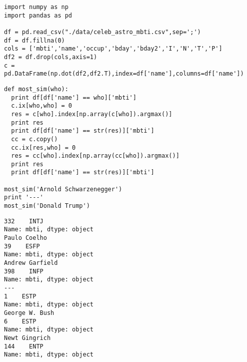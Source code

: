\documentclass[12pt,fleqn]{article}\usepackage{../common}
\begin{document}
\begin{verbatim}
import numpy as np
import pandas as pd

df = pd.read_csv("./data/celeb_astro_mbti.csv",sep=';')
df = df.fillna(0)
cols = ['mbti','name','occup','bday','bday2','I','N','T','P']
df2 = df.drop(cols,axis=1)
c = pd.DataFrame(np.dot(df2,df2.T),index=df['name'],columns=df['name'])
\end{verbatim}


\begin{verbatim}
def most_sim(who):
  print df[df['name'] == who]['mbti']
  c.ix[who,who] = 0
  res = c[who].index[np.array(c[who]).argmax()]
  print res
  print df[df['name'] == str(res)]['mbti']
  cc = c.copy()
  cc.ix[res,who] = 0
  res = cc[who].index[np.array(cc[who]).argmax()]
  print res
  print df[df['name'] == str(res)]['mbti']

most_sim('Arnold Schwarzenegger')
print '---'
most_sim('Donald Trump')
\end{verbatim}

\begin{verbatim}
332    INTJ
Name: mbti, dtype: object
Paulo Coelho
39    ESFP
Name: mbti, dtype: object
Andrew Garfield
398    INFP
Name: mbti, dtype: object
---
1    ESTP
Name: mbti, dtype: object
George W. Bush
6    ESTP
Name: mbti, dtype: object
Newt Gingrich
144    ENTP
Name: mbti, dtype: object
\end{verbatim}
\end{document}
